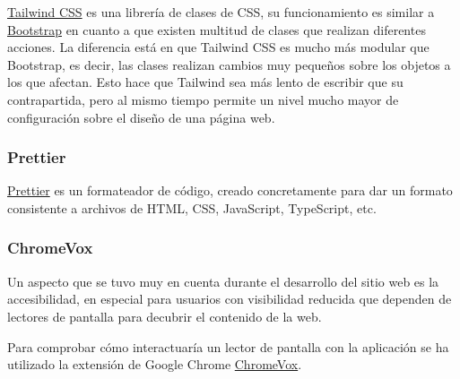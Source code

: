\href{https://tailwindcss.com/}{Tailwind CSS} es una librería de clases de CSS,
su funcionamiento es similar a \href{https://getbootstrap.com/}{Bootstrap} en
cuanto a que existen multitud de clases que realizan diferentes acciones. La
diferencia está en que Tailwind CSS es mucho más modular que Bootstrap, es
decir, las clases realizan cambios muy pequeños sobre los objetos a los que
afectan. Esto hace que Tailwind sea más lento de escribir que su contrapartida,
pero al mismo tiempo permite un nivel mucho mayor de configuración sobre el
diseño de una página web.

\subsubsection{Prettier}

\href{https://prettier.io/}{Prettier} es un formateador de código, creado
concretamente para dar un formato consistente a archivos de HTML, CSS,
JavaScript, TypeScript, etc.

\subsubsection{ChromeVox}

Un aspecto que se tuvo muy en cuenta durante el desarrollo del sitio web es la
accesibilidad, en especial para usuarios con visibilidad reducida que dependen
de lectores de pantalla para decubrir el contenido de la web.

Para comprobar cómo interactuaría un lector de pantalla con la aplicación se ha
utilizado la extensión de Google Chrome
\href{https://chrome.google.com/webstore/detail/screen-reader/kgejglhpjiefppelpmljglcjbhoiplfn}{ChromeVox}.

